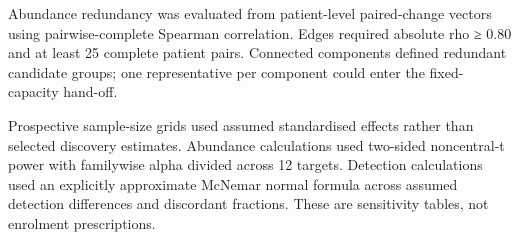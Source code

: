 Abundance redundancy was evaluated from patient-level paired-change vectors using pairwise-complete Spearman correlation. Edges required absolute rho ≥ 0.80 and at least 25 complete patient pairs. Connected components defined redundant candidate groups; one representative per component could enter the fixed-capacity hand-off.

Prospective sample-size grids used assumed standardised effects rather than selected discovery estimates. Abundance calculations used two-sided noncentral-t power with familywise alpha divided across 12 targets. Detection calculations used an explicitly approximate McNemar normal formula across assumed detection differences and discordant fractions. These are sensitivity tables, not enrolment prescriptions.
